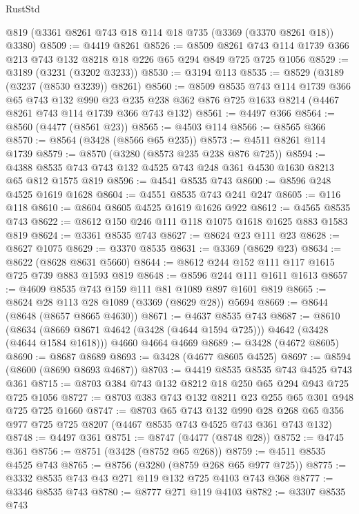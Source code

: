 \begin{lexlean}{RustStd}
\begin{coremodule}
    @819
    (@3361 @8261 @743 @18 @114 @18 @735 (@3369 (@3370 @8261 @18)) @3380)
@8509 := @4419 @8261
@8526 := @8509
    @8261
    @743
    @114
    @1739
    @366
    @213
    @743
    @132
    @8218
    @18
    @226
    @65
    @294
    @849
    @725
    @725
    @1056
@8529 := @3189 (@3231 (@3202 @3233))
@8530 := @3194 @113
@8535 := @8529 (@3189 (@3237 (@8530 @3239)) @8261)
@8560 := @8509
    @8535
    @743
    @114
    @1739
    @366
    @65
    @743
    @132
    @990
    @23
    @235
    @238
    @362
    @876
    @725
    @1633
    @8214
    (@4467 @8261 @743 @114 @1739 @366 @743 @132)
@8561 := @4497 @366
@8564 := @8560 (@4477 (@8561 @23))
@8565 := @4503 @114
@8566 := @8565 @366
@8570 := @8564 (@3428 (@8566 @65 @235))
@8573 := @4511 @8261 @114 @1739
@8579 := @8570 (@3280 (@8573 @235 @238 @876 @725))
@8594 := @4388 @8535 @743 @743 @132 @4525 @743 @248 @361 @4530 @1630 @8213 @65 @812 @1575 @819
@8596 := @4541 @8535 @743
@8600 := @8596 @248 @4525 @1619 @1628
@8604 := @4551 @8535 @743 @241 @247
@8605 := @116 @118
@8610 := @8604 @8605 @4525 @1619 @1626 @922
@8612 := @4565 @8535 @743
@8622 := @8612 @150 @246 @111 @118 @1075 @1618 @1625 @883 @1583 @819
@8624 := @3361 @8535 @743
@8627 := @8624 @23 @111 @23
@8628 := @8627 @1075
@8629 := @3370 @8535
@8631 := @3369 (@8629 @23)
@8634 := @8622 (@8628 @8631 @5660)
@8644 := @8612 @244 @152 @111 @117 @1615 @725 @739 @883 @1593 @819
@8648 := @8596 @244 @111 @1611 @1613
@8657 := @4609 @8535 @743 @159 @111 @81 @1089 @897 @1601 @819
@8665 := @8624 @28 @113 @28 @1089 (@3369 (@8629 @28)) @5694
@8669 := @8644 (@8648 (@8657 @8665 @4630))
@8671 := @4637 @8535 @743
@8687 := @8610
    (@8634 (@8669 @8671 @4642 (@3428 (@4644 @1594 @725))) @4642 (@3428 (@4644 @1584 @1618)))
    @4660
    @4664
    @4669
@8689 := @3428 (@4672 @8605)
@8690 := @8687 @8689
@8693 := @3428 (@4677 @8605 @4525)
@8697 := @8594 (@8600 (@8690 @8693 @4687))
@8703 := @4419 @8535 @8535 @743 @4525 @743 @361
@8715 := @8703 @384 @743 @132 @8212 @18 @250 @65 @294 @943 @725 @725 @1056
@8727 := @8703 @383 @743 @132 @8211 @23 @255 @65 @301 @948 @725 @725 @1660
@8747 := @8703
    @65
    @743
    @132
    @990
    @28
    @268
    @65
    @356
    @977
    @725
    @725
    @8207
    (@4467 @8535 @743 @4525 @743 @361 @743 @132)
@8748 := @4497 @361
@8751 := @8747 (@4477 (@8748 @28))
@8752 := @4745 @361
@8756 := @8751 (@3428 (@8752 @65 @268))
@8759 := @4511 @8535 @4525 @743
@8765 := @8756 (@3280 (@8759 @268 @65 @977 @725))
@8775 := @3332 @8535 @743 @43 @271 @119 @132 @725 @4103 @743 @368
@8777 := @3346 @8535 @743
@8780 := @8777 @271 @119 @4103
@8782 := @3307 @8535 @743

\end{coremodule}
\end{lexlean}
